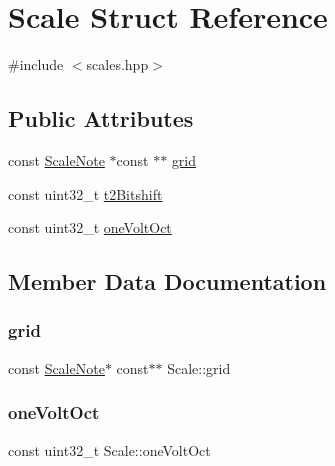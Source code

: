 \hypertarget{struct_scale}{}\section{Scale Struct Reference}
\label{struct_scale}


{\ttfamily \#include $<$scales.\+hpp$>$}

\subsection*{Public Attributes}
\begin{DoxyCompactItemize}
\item 
const \mbox{\hyperlink{struct_scale_note}{Scale\+Note}} $\ast$const  $\ast$$\ast$ \mbox{\hyperlink{struct_scale_a081b3efc5bc312d552d318fb45adae5f}{grid}}
\item 
const uint32\+\_\+t \mbox{\hyperlink{struct_scale_af19657225ced64387b92a317b84283b6}{t2\+Bitshift}}
\item 
const uint32\+\_\+t \mbox{\hyperlink{struct_scale_a976408a8efe95953c1fd6042eba03c23}{one\+Volt\+Oct}}
\end{DoxyCompactItemize}


\subsection{Member Data Documentation}
\mbox{\label{struct_scale_a081b3efc5bc312d552d318fb45adae5f}} 
\subsubsection{\texorpdfstring{grid}{grid}}
{\footnotesize\ttfamily const \mbox{\hyperlink{struct_scale_note}{Scale\+Note}}$\ast$ const$\ast$$\ast$ Scale\+::grid}

\mbox{\label{struct_scale_a976408a8efe95953c1fd6042eba03c23}} 
\subsubsection{\texorpdfstring{one\+Volt\+Oct}{oneVoltOct}}
{\footnotesize\ttfamily const uint32\+\_\+t Scale\+::one\+Volt\+Oct}

\mbox{\label{struct_scale_af19657225ced64387b92a317b84283b6}} 
